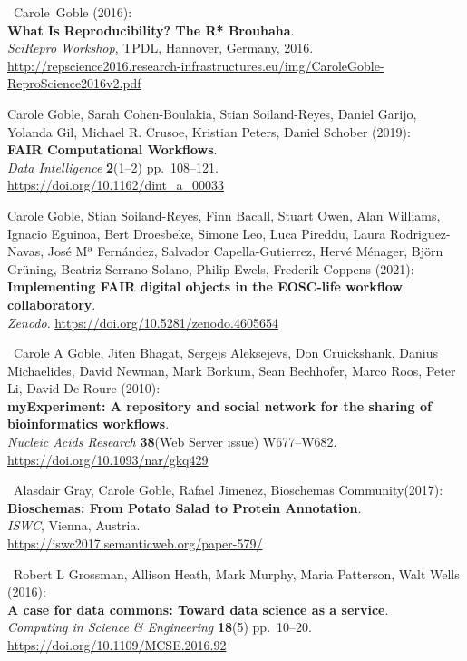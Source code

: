 \begin{thebibliography}{9}
~Carole~Goble (2016):\\
\textbf{What Is Reproducibility? The R* Brouhaha}.\\
\emph{SciRepro Workshop}, TPDL, Hannover, Germany, 2016.
\url{http://repscience2016.research-infrastructures.eu/img/CaroleGoble-ReproScience2016v2.pdf}

 Carole Goble, Sarah Cohen-Boulakia, Stian Soiland-Reyes, Daniel
Garijo, Yolanda Gil, Michael R. Crusoe, Kristian Peters, Daniel Schober
(2019):\\
\textbf{FAIR Computational Workflows}.\\
\emph{Data Intelligence} \textbf{2}(1--2) pp.~108--121.\\
\url{https://doi.org/10.1162/dint_a_00033}

 Carole Goble, Stian Soiland-Reyes, Finn Bacall, Stuart Owen,
Alan Williams, Ignacio Eguinoa, Bert Droesbeke, Simone Leo, Luca
Pireddu, Laura Rodriguez-Navas, José Mª Fernández, Salvador
Capella-Gutierrez, Hervé Ménager, Björn Grüning, Beatriz Serrano-Solano,
Philip Ewels, Frederik Coppens (2021):\\
\textbf{Implementing FAIR digital objects in the EOSC-life workflow
collaboratory}.\\
\emph{Zenodo}. \url{https://doi.org/10.5281/zenodo.4605654}

~Carole A Goble, Jiten Bhagat, Sergejs Aleksejevs, Don
Cruickshank, Danius Michaelides, David Newman, Mark Borkum, Sean
Bechhofer, Marco Roos, Peter Li, David De Roure (2010):\\
\textbf{myExperiment: A repository and social network for the sharing of
bioinformatics workflows}.\\
\emph{Nucleic Acids Research} \textbf{38}(Web Server issue)
W677--W682.\\
\url{https://doi.org/10.1093/nar/gkq429}

~Alasdair Gray, Carole Goble, Rafael Jimenez, Bioschemas
Community(2017):\\
\textbf{Bioschemas: From Potato Salad to Protein Annotation}.\\
\emph{ISWC}, Vienna, Austria.\\
\url{https://iswc2017.semanticweb.org/paper-579/}

~Robert L Grossman, Allison Heath, Mark Murphy, Maria Patterson,
Walt Wells (2016):\\
\textbf{A case for data commons: Toward data science as a service}.\\
\emph{Computing in Science \& Engineering} \textbf{18}(5) pp.~10--20.\\
\url{https://doi.org/10.1109/MCSE.2016.92}


\end{thebibliography}
